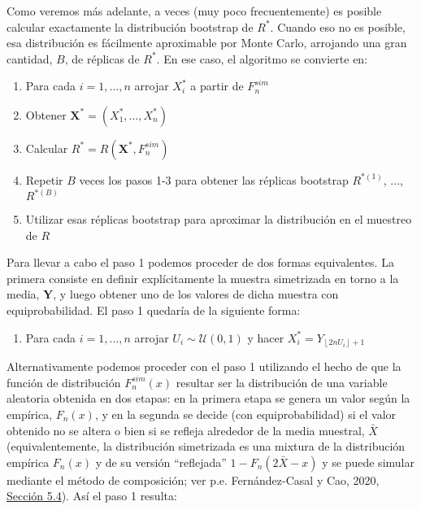 \documentclass[
]{book}
\providecommand{\tightlist}{%
  \setlength{\itemsep}{0pt}\setlength{\parskip}{0pt}}
\theoremstyle{break}
\theoremstyle{definition}
\theoremstyle{definition}
\theoremstyle{definition}
\theoremstyle{definition}
\theoremstyle{remark}
\begin{document}
Como veremos más adelante, a veces (muy poco frecuentemente) es posible
calcular exactamente la distribución bootstrap de \(R^{\ast}\). Cuando
eso no es posible, esa distribución es fácilmente aproximable por Monte
Carlo, arrojando una gran cantidad, \(B\), de réplicas de \(R^{\ast}\). En
ese caso, el algoritmo se convierte en:

\begin{enumerate}
\def\labelenumi{\arabic{enumi}.}
\item
  Para cada \(i=1,\ldots ,n\) arrojar \(X_i^{\ast}\) a partir de
  \(F_n^{sim}\)
\item
  Obtener \(\mathbf{X}^{\ast}=\left( X_1^{\ast},\ldots ,X_n^{\ast} \right)\)
\item
  Calcular
  \(R^{\ast}=R\left( \mathbf{X}^{\ast},F_n^{sim} \right)\)
\item
  Repetir \(B\) veces los pasos 1-3 para obtener las réplicas bootstrap
  \(R^{\ast (1)}\), \(\ldots\), \(R^{\ast (B)}\)
\item
  Utilizar esas réplicas bootstrap para aproximar la distribución en el
  muestreo de \(R\)
\end{enumerate}

Para llevar a cabo el paso 1 podemos proceder de dos formas
equivalentes. La primera consiste en definir explícitamente la muestra
simetrizada en torno a la media, \(\mathbf{Y}\), y luego obtener
uno de los valores de dicha muestra con equiprobabilidad. El paso 1
quedaría de la siguiente forma:

\begin{enumerate}
\def\labelenumi{\arabic{enumi}.}
\tightlist
\item
  Para cada \(i=1,\ldots ,n\) arrojar \(U_i\sim \mathcal{U}\left( 0,1 \right)\) y
  hacer \(X_i^{\ast}=Y_{\left\lfloor 2nU_i\right\rfloor +1}\)
\end{enumerate}

Alternativamente podemos proceder con el paso 1 utilizando el hecho de que la función de distribución \(F_n^{sim}\left( x \right)\) resultar ser la distribución de una variable aleatoria obtenida en dos etapas:
en la primera etapa se genera un valor según la empírica, \(F_n\left( x \right)\), y en la segunda se decide (con equiprobabilidad) si el valor obtenido no se altera o bien si se refleja alrededor de la media muestral, \(\bar{X}\)
(equivalentemente, la distribución simetrizada es una mixtura de la distribución empírica \(F_n\left( x \right)\) y de su versión ``reflejada'' \(1-F_n\left( 2\bar{X}-x \right)\) y se puede simular mediante el método de composición; ver p.e. Fernández-Casal y Cao, 2020, \href{https://rubenfcasal.github.io/simbook/m\%C3\%A9todo-de-composici\%C3\%B3n.html}{Sección 5.4}). Así el paso 1 resulta:
\end{document}
